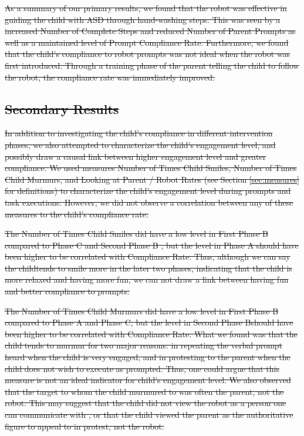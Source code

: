 \documentclass{ut-thesis}
\providecommand{\DIFdeltex}[1]{{\protect\color{red}\sout{#1}}}                      %
\providecommand{\DIFdel}[1]{\texorpdfstring{\DIFdeltex{#1}}{}} %
\begin{document}
\DIFdel{As a summary of our primary results, we found that the robot was effective in guiding the child with ASD through hand-washing steps.  This was seen by a increased Number of Complete Steps and reduced Number of Parent Prompts as well as a maintained level of Prompt Compliance Rate.  Furthermore, we found that the child's compliance to robot prompts was not ideal when the robot was first introduced.  Through a training phase of the parent telling the child to follow the robot, the compliance rate was immediately improved.  }%

\subsection{\DIFdel{Secondary Results}}
\addtocounter{subsection}{-1}%
\DIFdel{In addition to investigating the child's compliance in different intervention phases, we also attempted to characterize the child's engagement level, and possibly draw a causal link between higher engagement level and greater compliance.  We used measures Number of Times Child Smiles, Number of Times Child Murmurs, and Looking at Parent / Robot Rates (see Section \ref{sec:measures} for definitions) to characterize the child's engagement level during prompts and task executions.  However, we did not observe a correlation between any of these measures to the child's compliance rate.
}%

\DIFdel{The Number of Times Child Smiles did have a low level in First Phase B compared to Phase C and Second Phase B , but the level in Phase A should have been higher to be correlated with Compliance Rate.  Thus, although we can say the childtends to smile more in the later two phases, indicating that the child is more relaxed and having more fun, we can not draw a link between having fun and better compliance to prompts.
}%

\DIFdel{The Number of Times Child Murmurs did have a low level in First Phase B compared to Phase A and Phase C, but the level in Second Phase Bshould have been higher to be correlated with Compliance Rate.  What we found was that the child tends to murmur for two major reasons: in repeating the verbal prompt heard when the child is very engaged, and in protesting to the parent when the child does not wish to execute as prompted.  Thus, one could argue that this measure is not an ideal indicator for child's engagement level.  We also observed that the target to whom the child murmured to was often the parent, not the robot.  This may suggest that the child did not view the robot as a person one can communicate with , or that the child viewed the parent as the authoritative figure to appeal to in protest, not the robot.  }%
\end{document}
